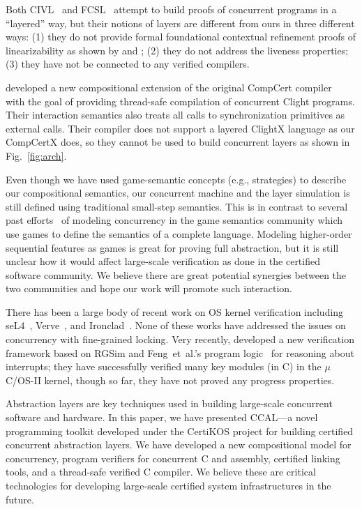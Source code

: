 Both CIVL~\cite{civl15} and FCSL~\cite{sergey15pldi} attempt to build
proofs of concurrent programs in a ``layered'' way, but their notions
of layers are different from ours in three different ways: (1) they do
not provide formal foundational contextual refinement proofs of
linearizability as shown by \cite{filipovic10} and \cite{liang13};
(2) they do not address the liveness properties; (3) they have not be
connected to any verified compilers.

\cite{stewart15} developed a new compositional extension of the
original CompCert compiler~\cite{compcert} with the goal of providing
thread-safe compilation of concurrent Clight programs.  Their
interaction semantics also treats all calls to synchronization
primitives as external calls. Their compiler does not support a layered
ClightX language as our CompCertX does, so they cannot be used
to build concurrent layers as shown in Fig.~\ref{fig:arch}. 

 Even though we have used
game-semantic concepts (e.g., strategies) to describe our
compositional semantics, our concurrent machine and the layer simulation is still defined using
traditional small-step semantics.  This is in contrast to several past
efforts~\cite{ghica08,nishimura13,rideau11,abramsky99} of modeling
concurrency in the game semantics community which use games to
define the semantics of a complete language. Modeling higher-order
sequential features as games is great for proving full abstraction,
but it is still unclear how it would affect large-scale 
verification as done in the certified software community.  We 
believe there are great potential synergies between the two communities
and hope our work will promote such interaction.

 There has been a large body
of recent work on OS kernel verification including
seL4~\cite{klein2009sel4,klein14},
Verve~\cite{hawblitzel10},
and Ironclad~\cite{ironclad14}. None of these works have addressed the
issues on concurrency with fine-grained locking. Very recently,
\cite{xu16} developed a new verification framework based on RGSim
and Feng~{et~al.}'s program logic~\cite{feng08:aim} for reasoning
about interrupts; they have successfully verified many key modules
(in C) in the $\mu$C/OS-II kernel, though so far, they have not proved
any progress properties.


Abstraction layers are key techniques used in building large-scale
concurrent software and hardware. In this paper, we have presented
CCAL---a novel programming toolkit developed under the CertiKOS project for building certified concurrent
abstraction layers.  We have developed a new compositional model
for concurrency, program verifiers for concurrent C and assembly,
certified linking tools, and a thread-safe verified C compiler. 
We believe these are critical technologies 
for developing large-scale certified system infrastructures in the future.

